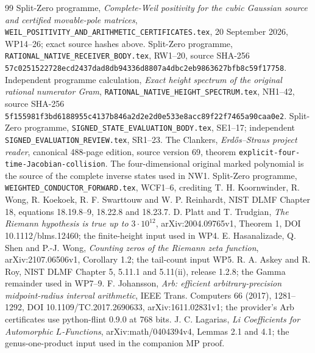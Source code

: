 \documentclass[11pt]{article}
\begin{document}
\begin{thebibliography}{99}
 Split-Zero programme,
\emph{Complete-Weil positivity for the cubic Gaussian source
and certified movable-pole matrices},
\texttt{WEIL\_POSITIVITY\_AND\_ARITHMETIC\_CERTIFICATES.tex},
20 September 2026, WP14--26; exact source hashes above.
 Split-Zero programme,
\texttt{RATIONAL\_NATIVE\_RECEIVER\_BODY.tex}, RW1--20,
source SHA-256
\texttt{57c0251522728ecd2437dad8db94336d8807a4dbc2eb9863627bfb8c59f17758}.
 Independent programme calculation,
\emph{Exact height spectrum of the original rational
numerator Gram}, \texttt{RATIONAL\_NATIVE\_HEIGHT\_SPECTRUM.tex},
NH1--42, source SHA-256
\texttt{5f155981f3bd6188955c4137b846a2d2e2d0e533e8acc89f22f7465a90caa0e2}.
 Split-Zero programme,
\texttt{SIGNED\_STATE\_EVALUATION\_BODY.tex}, SE1--17;
independent \texttt{SIGNED\_EVALUATION\_REVIEW.tex}, SR1--23.
 The Clankers, \emph{Erd\H{o}s--Straus project
reader}, canonical 488-page edition, source version 69,
theorem \texttt{explicit-four-time-Jacobian-collision}.
The four-dimensional original marked polynomial is the
source of the complete inverse states used in NW1.
 Split-Zero programme,
\texttt{WEIGHTED\_CONDUCTOR\_FORWARD.tex}, WCF1--6,
crediting T. H. Koornwinder, R. Wong, R. Koekoek,
R. F. Swarttouw and W. P. Reinhardt, NIST DLMF Chapter 18,
equations 18.19.8--9, 18.22.8 and 18.23.7.
 D. Platt and T. Trudgian,
\emph{The Riemann hypothesis is true up to $3\cdot10^{12}$},
arXiv:2004.09765v1, Theorem 1, DOI 10.1112/blms.12460;
the finite-height input used in WP4.
 E. Hasanalizade, Q. Shen and P.-J. Wong,
\emph{Counting zeros of the Riemann zeta function},
arXiv:2107.06506v1, Corollary 1.2; the tail-count input WP5.
 R. A. Askey and R. Roy, NIST DLMF
Chapter 5, 5.11.1 and 5.11(ii), release 1.2.8;
the Gamma remainder used in WP7--9.
 F. Johansson,
\emph{Arb: efficient arbitrary-precision midpoint-radius
interval arithmetic}, IEEE Trans. Computers 66 (2017),
1281--1292, DOI 10.1109/TC.2017.2690633,
arXiv:1611.02831v1; the provider's Arb certificates use
python-flint 0.9.0 at 768 bits.
 J. C. Lagarias,
\emph{Li Coefficients for Automorphic $L$-Functions},
arXiv:math/0404394v4, Lemmas 2.1 and 4.1;
the genus-one-product input used in the companion MP proof.
\end{thebibliography}
\end{document}
